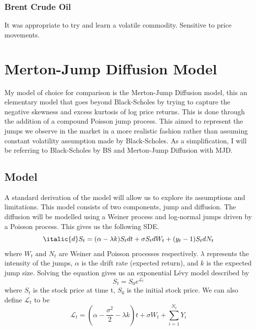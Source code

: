 \documentclass[12pt]{article}
\numberwithin{equation}{section}
\begin{document}
\subsubsection{Brent Crude Oil}
It was appropriate to try and learn a volatile commodity. Sensitive to price 
movements.

\clearpage

\section{Merton-Jump Diffusion Model}
My model of choice for comparison is the Merton-Jump Diffusion model, this an 
elementary model that goes beyond Black-Scholes by trying to capture the negative
skewness and excess kurtosis of log price returns. This is done through the 
addition of a compound Poisson jump process. This aimed to represent the jumps 
we observe in the market in a more realistic fashion rather than assuming constant 
volatility assumption made by Black-Scholes. As a simplification, I will be referring 
to Black-Scholes by BS and Merton-Jump Diffusion with MJD.


\subsection{Model}
A standard derivation of the model will allow us to explore its assumptions and 
limitations. This model consists of two components, jump and diffusion. The 
diffusion will be modelled using a Weiner process and log-normal jumps driven 
by a Poisson process. This gives us the following
SDE. 
\begin{equation}
  \italic{d}S_t = (\alpha - \lambda k)S_tdt + \sigma S_t dW_t + (y_t-1)S_tdN_t
\end{equation}
where $W_t \text{ and } N_t$ are Weiner and Poisson processes respectively. 
$\lambda$ represents the intensity of the jumps, $\alpha$ is the drift rate
(expected return), and $k$ is the expected jump size. 
Solving the equation gives us an exponential L\'{e}vy model described by 
\begin{equation}
  S_t = S_0e^{\mathcal{L}_t}
\end{equation}
where $S_t$ is the stock price at time t, $S_0$ is the initial stock price. 
We can also define $\mathcal{L}_t$ to be 
\begin{equation}
  \mathcal{L}_t = (\alpha - \frac{\sigma^2}{2}-\lambda k)t + \sigma W_t + 
  \sum^{N_t}_{i=1}Y_i
\end{equation}
\end{document}

